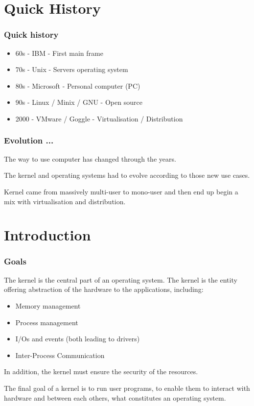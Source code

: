 %
%

\section{Quick History}

\begin{frame}
\frametitle{Quick history}

        \begin{itemize}
                \item 60s - IBM - First main frame
                \item 70s - Unix - Servers operating system 
                \item 80s - Microsoft  - Personal computer (PC)
                \item 90s - Linux / Minix / GNU - Open source
                \item 2000 - VMware / Goggle - Virtualisation / Distribution 
        \end{itemize}

\end{frame}

\begin{frame}
\frametitle{Evolution ...}
The way to use computer has changed through the years.

  \-

The kernel and operating systems had to evolve according to those new
use cases.

  \-

Kernel came from massively multi-user to mono-user and then end up begin a mix with virtualisation and distribution.
\end{frame}

\section{Introduction}


\begin{frame}
  \frametitle{Goals}

  The kernel is the central part of an operating system. The kernel is the entity offering abstraction of the hardware to the applications, including:

  \begin{itemize}
  \item
    Memory management
  \item
    Process management
  \item
    I/Os and events (both leading to drivers)
  \item
    Inter-Process Communication
  \end{itemize}

  In addition, the kernel must ensure the security of the resources.

  \-

  The final goal of a kernel is to run user programs, to enable them
  to interact with hardware and between each others, what constitutes
  an operating system.

\end{frame}

